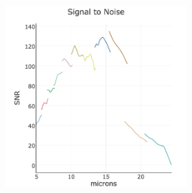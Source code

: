 \documentclass[12pt]{article}
\begin{document}
\hspace{-2.5cm}
\begin{figure}[h]
  \begin{center}
    \hspace{-0.5cm}
    \includegraphics[height=7.0cm,width=7.0cm]{../Figures/current_wavelength_vsSNR.png}
    \vspace{-10pt}
    \caption{       \footnotesize}
    \vspace{-14pt}
    \label{figtest-fig}
  \end{center}
\end{figure}




%
%
\alttargets   %



%
%
\specialreq             %


%
%
\coordinatedobs %

\end{document}
